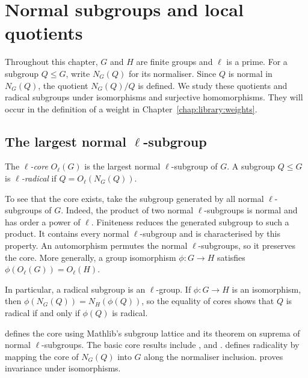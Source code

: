 \chapter{Normal subgroups and local quotients}
\label{chap:library:groups}

Throughout this chapter, $G$ and $H$ are finite groups and $\ell$ is a prime.
For a subgroup $Q\leq G$, write $N_G(Q)$ for its normaliser. Since $Q$ is
normal in $N_G(Q)$, the quotient $N_G(Q)/Q$ is defined. We study these
quotients and radical subgroups under isomorphisms and surjective
homomorphisms. They will occur in the definition of a weight in
Chapter~\ref{chap:library:weights}.

\section{The largest normal \texorpdfstring{$\ell$}{ell}-subgroup}

\begin{definition}
The \emph{$\ell$-core} $O_\ell(G)$ is the largest normal $\ell$-subgroup
of $G$. A subgroup $Q\leq G$ is \emph{$\ell$-radical} if
$Q=O_\ell(N_G(Q))$.
\end{definition}

To see that the core exists, take the subgroup generated by all normal
$\ell$-subgroups of $G$. Indeed,
the product of two normal $\ell$-subgroups is normal and has order a power
of $\ell$. Finiteness reduces the generated subgroup to such a product.
It contains every normal $\ell$-subgroup and is characterised by this
property. An automorphism permutes the normal $\ell$-subgroups, so it
preserves the core. More generally, a group isomorphism $\phi:G\to H$ satisfies
$\phi(O_\ell(G))=O_\ell(H)$.

In particular, a radical subgroup is an $\ell$-group. If $\phi:G\to H$ is
an isomorphism, then $\phi(N_G(Q))=N_H(\phi(Q))$, so the equality of cores
shows that $Q$ is radical if and only if $\phi(Q)$ is radical.
\begin{implementation}
 defines the core using Mathlib's subgroup lattice
and its theorem on suprema of normal $\ell$-subgroups.
The basic core results include
,  and
.
 defines radicality by mapping the core
of $N_G(Q)$ into $G$ along the normaliser inclusion.
 proves invariance under isomorphisms.
\end{implementation}

